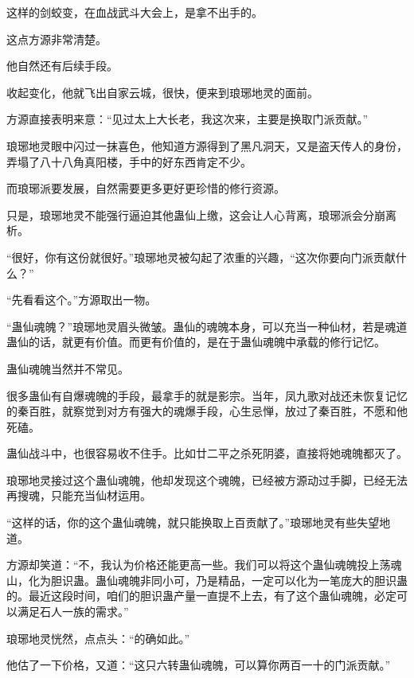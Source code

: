 \begin{this_body}
这样的剑蛟变，在血战武斗大会上，是拿不出手的。

这点方源非常清楚。

他自然还有后续手段。

收起变化，他就飞出自家云城，很快，便来到琅琊地灵的面前。

方源直接表明来意：“见过太上大长老，我这次来，主要是换取门派贡献。”

琅琊地灵眼中闪过一抹喜色，他知道方源得到了黑凡洞天，又是盗天传人的身份，弄塌了八十八角真阳楼，手中的好东西肯定不少。

而琅琊派要发展，自然需要更多更好更珍惜的修行资源。

只是，琅琊地灵不能强行逼迫其他蛊仙上缴，这会让人心背离，琅琊派会分崩离析。

“很好，你有这份就很好。”琅琊地灵被勾起了浓重的兴趣，“这次你要向门派贡献什么？”

“先看看这个。”方源取出一物。

“蛊仙魂魄？”琅琊地灵眉头微皱。蛊仙的魂魄本身，可以充当一种仙材，若是魂道蛊仙的话，就更有价值。而更有价值的，是在于蛊仙魂魄中承载的修行记忆。

蛊仙魂魄当然并不常见。

很多蛊仙有自爆魂魄的手段，最拿手的就是影宗。当年，凤九歌对战还未恢复记忆的秦百胜，就察觉到对方有强大的魂爆手段，心生忌惮，放过了秦百胜，不愿和他死磕。

蛊仙战斗中，也很容易收不住手。比如廿二平之杀死阴婆，直接将她魂魄都灭了。

琅琊地灵接过这个蛊仙魂魄，他却发现这个魂魄，已经被方源动过手脚，已经无法再搜魂，只能充当仙材运用。

“这样的话，你的这个蛊仙魂魄，就只能换取上百贡献了。”琅琊地灵有些失望地道。

方源却笑道：“不，我认为价格还能更高一些。我们可以将这个蛊仙魂魄投上荡魂山，化为胆识蛊。蛊仙魂魄非同小可，乃是精品，一定可以化为一笔庞大的胆识蛊的。最近这段时间，咱们的胆识蛊产量一直提不上去，有了这个蛊仙魂魄，必定可以满足石人一族的需求。”

琅琊地灵恍然，点点头：“的确如此。”

他估了一下价格，又道：“这只六转蛊仙魂魄，可以算你两百一十的门派贡献。”

\end{this_body}

